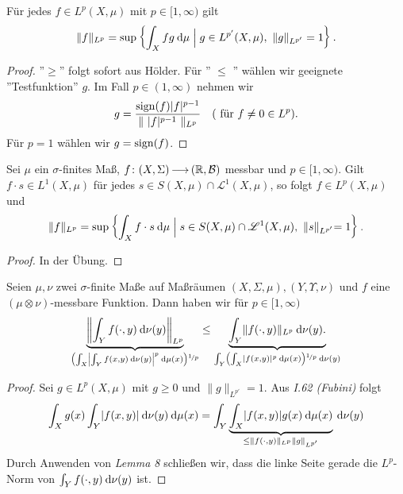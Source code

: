 \documentclass[skript.tex]{subfiles}
\begin{document}
\begin{cor}
	Für jedes $f \in L^p (X,\mu)$ mit $p \in [1, \infty)$ gilt
	\[
		\lVert f \rVert_{L^p} = \sup \left\{\int_X fg \: \mathrm{d} \mu \mathrel{\Big|}  g \in L^{p'} (X,\mu),\ \lVert g \rVert_{L^{p'} }= 1\right\}.
	\]
\end{cor}

\begin{proof}
	''$\geq$'' folgt sofort aus Hölder. Für '' $\leq$ '' wählen wir geeignete ''Testfunktion'' $g$. Im Fall $p \in (1, \infty)$ nehmen wir
	\[
		g = \frac{\operatorname{sign}(f) \lvert f \rvert^{p-1}}{\lVert\ \lvert f \rvert^{p-1}\ \rVert_{L^p}} \quad (\text{ für } f \neq 0 \in L^p).
	\]
	Für $p=1$ wählen wir $g = \operatorname{sign} (f)$.
\end{proof}

\begin{lem}
	Sei $\mu$ ein $\sigma$-finites Maß, $f\colon (X,\Sigma) \kern -1pt \longrightarrow \kern -1pt (\mathbb{R}, \mathcal{B})$ messbar und $p\in [1, \infty)$. Gilt \\$f\cdot s \in L^1(X,\mu)$ für jedes $s \in S(X,\mu) \cap \mathscr{L}^1(X,\mu)$, so folgt $f \in L^p(X,\mu)$ und 
	\[
		\lVert f \rVert_{L^{p}} = \sup \left\{\int_X f\cdot s \: \mathrm{d} \mu \mathrel{\Big|} s \in S(X,\mu) \cap \mathscr{L}^1(X,\mu),\ \rVert s \lVert_{L^{p'}} =1\right\}.
	\]
\end{lem}

\begin{proof}
	In der Übung.
\end{proof}

\begin{theorem}[Minkowski]
	Seien $\mu, \nu$ zwei $\sigma$-finite Maße auf Maßräumen $(X, \Sigma, \mu), (Y, \Upsilon, \nu)$ und $f$ eine $(\mu \otimes \nu)$-messbare Funktion. Dann haben wir für $p\in [1, \infty)$
	\[
		\underbrace{\left\Vert \int_Y f(\cdot, y) \md \nu(y) \right\Vert_{L^p}}_{\pr{\int_X \left\vert \int_Y f(x,y) \md \nu(y) \right\vert^p \md \mu(x)}^{\nicefrac{1}{p}}} \leq \underbrace{ \int_Y \lVert f(\cdot, y) \rVert_{L^p} \md \nu(y).}_{\int_Y\pr{\int_X \lvert f(x,y) \rvert^p \md \mu(x)}^{\nicefrac{1}{p}} \md \nu(y)}
	\]
\end{theorem}

\begin{proof}
	Sei $g \in L^p(X,\mu)$ mit $g \geq 0$ und $\lVert g \rVert_{L^{p'}} =1$. Aus \textit{I.62 (Fubini)} folgt 
	\[
		\int_X g(x) \int_Y \lvert f(x,y) \rvert \: \mathrm{d} \nu(y) \: \mathrm{d} \mu(x) = \int_Y \underbrace{\int_X \lvert f(x,y)\rvert g(x) \: \mathrm{d} \mu(x)}_{\leq \lVert f(\cdot, y) \rVert_{L^{p}} \lVert g \rVert_{L^{p'}}} \: \mathrm{d} \nu(y)
	\]
	Durch Anwenden von \textit{Lemma 8} schließen wir, dass die linke Seite gerade die $L^p$-Norm von $\int_Y f(\cdot, y) \: \mathrm{d} \nu(y)$ ist.
\end{proof}
\end{document}

